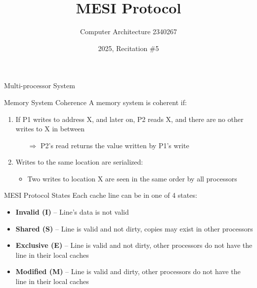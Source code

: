 \documentclass[aspectratio=169,12pt]{beamer}
\title{MESI Protocol}
\author{Computer Architecture 2340267}
\date{2025, Recitation \#5}
\begin{document}
\frame{\titlepage}

\begin{frame}{Multi-processor System}
\begin{block}{Memory System Coherence}
A memory system is coherent if:
\end{block}

\begin{enumerate}
\item If P1 writes to address X, and later on, P2 reads X, and there are no other writes to X in between
    \begin{itemize}
    \item[$\Rightarrow$] P2's read returns the value written by P1's write
    \end{itemize}
\item Writes to the same location are serialized:
    \begin{itemize}
    \item Two writes to location X are seen in the same order by all processors
    \end{itemize}
\end{enumerate}

\vspace{1em}
\begin{center}
\end{center}
\end{frame}

\begin{frame}{MESI Protocol States}
Each cache line can be in one of 4 states:

\begin{itemize}
\item \textbf{Invalid (I)} -- Line's data is not valid
\vspace{0.5em}
\item \textbf{Shared (S)} -- Line is valid and not dirty, copies may exist in other processors
\vspace{0.5em}
\item \textbf{Exclusive (E)} -- Line is valid and not dirty, other processors do not have the line in their local caches
\vspace{0.5em}
\item \textbf{Modified (M)} -- Line is valid and dirty, other processors do not have the line in their local caches
\end{itemize}
\end{frame}
\end{document}
